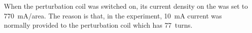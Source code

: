 




When the perturbation coil was switched on, its current density on the
was set to 770~mA/area.  The reason is that, in the experiment, 10~mA
current was normally provided to the perturbation coil which has
77~turns.



